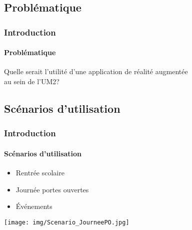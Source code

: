 \subsection{Problématique}

\begin{frame}
\frametitle{Introduction}
\framesubtitle{Problématique}

\begin{center}Quelle serait l'utilité d'une application de réalité augmentée\\
		au sein de l'UM2?\end{center}
\end{frame}

\subsection{Scénarios d'utilisation}

\begin{frame}
\frametitle{Introduction}
\framesubtitle{Scénarios d'utilisation}
\begin{itemize}						
	\item{Rentrée scolaire}
	\item{Journée portes ouvertes}
	\item{Événements}
\end{itemize}
\begin{flushright}\texttt{[image: img/Scenario\_JourneePO.jpg]}\end{flushright}
\end{frame}
